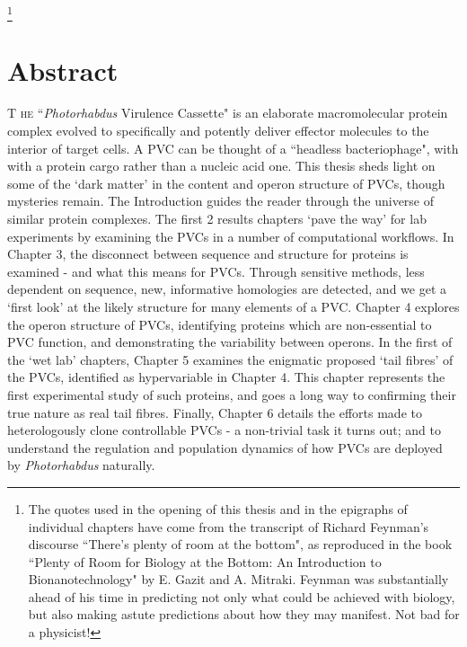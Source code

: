 \documentclass[a4paper, oneside, 11pt]{report} %
\makeatletter
\newcommand\markerlessfootnote[1]{%
  \begingroup
  \makeatletter
  \renewcommand\footnoterule{%
    \kern-3\p@
    \hrule\@width \textwidth
    \kern2/6\p@}
    \makeatother
  \renewcommand\thefootnote{}\footnote{#1}%
  \addtocounter{footnote}{-1}%
  \endgroup
}
\makeatother
\begin{document}
\markerlessfootnote{The quotes used in the opening of this thesis and in the epigraphs of individual chapters have come from the transcript of Richard Feynman's discourse ``There's plenty of room at the bottom", as reproduced in the book ``Plenty of Room for Biology at the Bottom: An Introduction to Bionanotechnology" by E. Gazit and A. Mitraki. Feynman was substantially ahead of his time in predicting not only what could be achieved with biology, but also making astute predictions about how they may manifest. Not bad for a physicist!}
\clearpage

\newpage
\chapter*{Abstract}
\lettrine[lraise=0.0, nindent=0.1em, slope=1em]{T}{ he} ``\emph{Photorhabdus} Virulence Cassette" is an elaborate macromolecular protein complex evolved to specifically and potently deliver effector molecules to the interior of target cells. A PVC can be thought of a ``headless bacteriophage", with with a protein cargo rather than a nucleic acid one. This thesis sheds light on some of the `dark matter' in the content and operon structure of PVCs, though mysteries remain. The Introduction guides the reader through the universe of similar protein complexes. The first 2 results chapters `pave the way' for lab experiments by examining the PVCs in a number of computational workflows. In Chapter 3, the disconnect between sequence and structure for proteins is examined - and what this means for PVCs. Through sensitive methods, less dependent on sequence, new, informative homologies are detected, and we get a `first look' at the likely structure for many elements of a PVC. Chapter 4 explores the operon structure of PVCs, identifying proteins which are non-essential to PVC function, and demonstrating the variability between operons. In the first of the `wet lab' chapters, Chapter 5 examines the enigmatic proposed `tail fibres' of the PVCs, identified as hypervariable in Chapter 4. This chapter represents the first experimental study of such proteins, and goes a long way to confirming their true nature as real tail fibres. Finally, Chapter 6 details the efforts made to heterologously clone controllable PVCs - a non-trivial task it turns out; and to understand the regulation and population dynamics of how PVCs are deployed by \emph{Photorhabdus} naturally.
\end{document}
